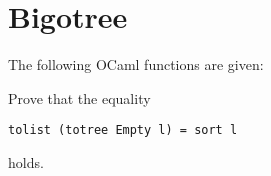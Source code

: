 \section{Bigotree}
The following OCaml functions are given:



Prove that the equality
\begin{center}
    \begin{lstlisting}
tolist (totree Empty l) = sort l\end{lstlisting}
\end{center}
holds.